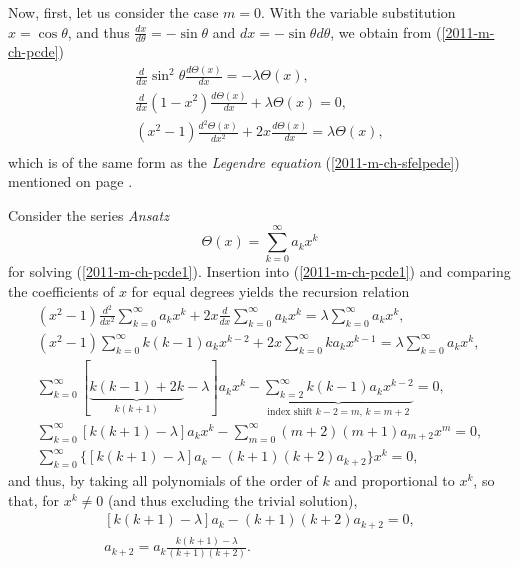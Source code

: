 Now, first, let us consider the case $m=0$.
With the variable substitution
$x = \cos \theta$, and thus
$\frac{dx}{d\theta}= -\sin \theta$ and  $dx= -\sin \theta d\theta$, we obtain from (\ref{2011-m-ch-pcde})
\begin{equation}
\begin{split}
\frac{   d   }{   d    x }
\sin^2 \theta \frac{   d    \Theta(x)}{   d    x }
= -  \lambda  \Theta(x)   ,\\
\frac{   d   }{   d    x }
(1-x^2) \frac{   d    \Theta(x)}{   d    x } +  \lambda  \Theta(x)
=  0 ,\\
\left(x^2-1 \right)\frac{   d   ^2 \Theta(x)}{   d    x^2 } + 2 x \frac{   d    \Theta(x)}{   d    x } =  \lambda  \Theta(x)
,\\
\end{split}
\label{2011-m-ch-pcde1}
\end{equation}
which is of the same form as the {\em Legendre equation}
(\ref{2011-m-ch-sfelpede})
mentioned on page \pageref{2011-m-ch-sfelpede}.

Consider the series {\it Ansatz}
\begin{equation}
\Theta(x) = \sum_{k=0}^\infty  a_k x^k
\label{2011-m-ch-pcde12}
\end{equation}
for solving (\ref{2011-m-ch-pcde1}).
Insertion into  (\ref{2011-m-ch-pcde1}) and comparing the coefficients of $x$
for equal degrees
yields the recursion relation
\begin{equation}
\begin{split}
\left(x^2-1 \right)\frac{   d   ^2  }{   d    x^2 }
 \sum_{k=0}^\infty  a_k x^k
   + 2 x \frac{   d    }{   d    x } \sum_{k=0}^\infty  a_k x^k
=  \lambda \sum_{k=0}^\infty  a_k x^k  ,\\
%
 \left(x^2-1 \right) \sum_{k=0}^\infty  k(k-1) a_k x^{k-2}
   + 2 x  \sum_{k=0}^\infty  k a_k x^{k-1}
=  \lambda \sum_{k=0}^\infty  a_k x^k  ,\\
%
\sum_{k=0}^\infty
\left[ \underbrace{k(k-1) + 2k}_{k(k+1)} -\lambda \right] a_k  x^k
-
\underbrace{\sum_{k=2}^\infty k(k-1) a_k x^{k-2}}_{\text{index shift }k-2=m\text{, }k=m+2}
=0
 ,\\
\sum_{k=0}^\infty
\left[ k(k+1) -\lambda \right] a_k  x^k
-
\sum_{m=0}^\infty (m+2)(m+1) a_{m+2} x^m
=0
 ,\\
%
\sum_{k=0}^\infty
\Big\{
\left[ k(k+1) -\lambda \right] a_k
-
 (k+1)(k+2) a_{k+2}
\Big\}
x^k
=0
 ,
\end{split}
\label{2011-m-ch-pcde123}
\end{equation}
and thus, by taking all polynomials of the order of $k$ and proportional to $x^k$,
so that, for $x^k\neq 0$ (and thus excluding the trivial solution),
\begin{equation}
\begin{split}
\left[ k(k+1) -\lambda \right] a_k -
 (k+1)(k+2) a_{k+2} =0,\\
a_{k+2} = a_k \frac{k(k+1) - \lambda}{(k+1)(k+2)}.
\end{split}
\label{2011-m-ch-pcde1236}
\end{equation}

